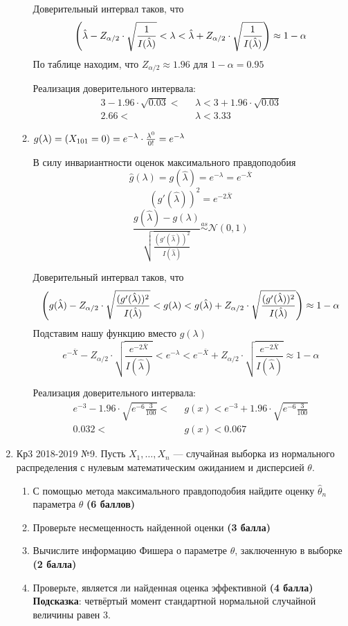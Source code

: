 \documentclass[a4paper,11pt]{article}
\let\P\relax
\DeclareMathOperator{\P}{\mathbb{P}}
\newcommand{\cN}{\mathcal{N}}
\begin{document}
\begin{enumerate}
\begin{enumerate}
Доверительный интервал таков, что
\[
\P \left(\hat {\lambda} - Z_{\alpha / 2} \cdot \sqrt{\frac{1}{I(\hat {\lambda})}} < \lambda < \hat {\lambda} + Z_{\alpha / 2} \cdot \sqrt{\frac{1}{I(\hat {\lambda})}}\right) \approx 1-\alpha
\]
По таблице находим, что $Z_{\alpha/2} \approx 1.96$ для $1-\alpha = 0.95$

Реализация доверительного интервала:
\begin{align*}
	3 - 1.96 \cdot \sqrt{0.03} < &\text{ } \lambda < 3 + 1.96 \cdot \sqrt{0.03} \\
	2.66 < & \text{ }\lambda < 3.33
\end{align*}

\item $g(\lambda) = \P(X_{101} = 0) = e^{-\lambda} \cdot \frac{\lambda^0}{0!} = e^{-\lambda}$

В силу инвариантности оценок максимального правдоподобия 
\[\hat g(\lambda) = g(\hat \lambda) = e^{-\lambda} = e^{-\bar X}\]
\[
(g'(\hat \lambda))^2 = e^{-2 \bar X} 
\]
\[
\frac{g(\hat \lambda) - g(\lambda)}{\sqrt{\frac{(g'(\hat \lambda))^2}{I(\hat \lambda)}}} \stackrel{as}{\sim} \cN(0,1)
\]

Доверительный интервал таков, что
\[
\P \left(g(\hat \lambda) - Z_{\alpha / 2} \cdot \sqrt{\frac{(g'(\hat \lambda))^2}{I(\hat \lambda)}} < g(\lambda ) < g(\hat \lambda) + Z_{\alpha / 2} \cdot \sqrt{\frac{(g'(\hat \lambda))^2}{I(\hat \lambda)}}\right) \approx 1-\alpha
\]
Подставим нашу функцию вместо $g(\lambda)$
\[
e^{-\bar X} - Z_{\alpha / 2} \cdot \sqrt{\frac{e^{-2 \bar X}}{I(\hat \lambda)}} < e^{-\lambda} < e^{-\bar X} + Z_{\alpha / 2} \cdot \sqrt{\frac{e^{-2 \bar X}}{I(\hat \lambda)}} \approx 1-\alpha
\]

Реализация доверительного интервала:
\begin{align*}
	e^{-3} - 1.96 \cdot \sqrt{e^{-6} \frac{3}{100}} < &\text{ } g(x) < e^{-3} + 1.96 \cdot \sqrt{e^{-6} \frac{3}{100}} \\
	0.032 < & \text{ } g(x) < 0.067
\end{align*}
\end{enumerate}

\item Кр3 2018-2019 №9. Пусть $X_{1}, \ldots, X_{n}$ — случайная выборка из нормального распределения с нулевым математическим ожиданием и дисперсией $\theta$.\label{Кр3 2018-2019 №9}

\begin{enumerate}
\item С помощью метода максимального правдоподобия найдите оценку $\hat{\theta}_{n}$ параметра $\theta$ \textbf{(6 баллов)}
\item Проверьте несмещенность найденной оценки \textbf{(3 балла)}
\item Вычислите информацию Фишера о параметре $\theta$, заключенную в выборке \textbf{(2 балла)}
\item Проверьте, является ли найденная оценка эффективной \textbf{(4 балла)}
\textbf{Подсказка}: четвёртый момент стандартной нормальной случайной величины равен 3.
\end{enumerate}


\end{enumerate}
\end{document}
